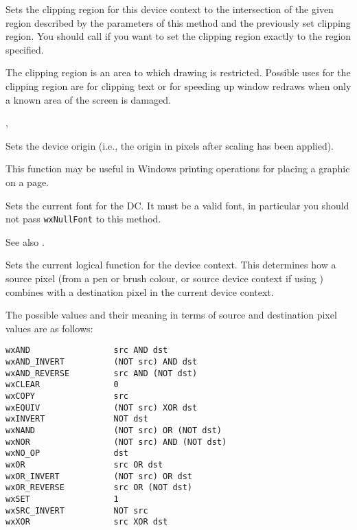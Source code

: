 
Sets the clipping region for this device context to the intersection of the
given region described by the parameters of this method and the previously set
clipping region. You should call 
 if you want to set
the clipping region exactly to the region specified.

The clipping region is an area to which drawing is restricted. Possible uses
for the clipping region are for clipping text or for speeding up window redraws
when only a known area of the screen is damaged.


, 


\label{wxdcsetdeviceorigin}


Sets the device origin (i.e., the origin in pixels after scaling has been
applied).

This function may be useful in Windows printing
operations for placing a graphic on a page.


\label{wxdcsetfont}


Sets the current font for the DC. It must be a valid font, in particular you
should not pass {\tt wxNullFont} to this method.

See also .


\label{wxdcsetlogicalfunction}


Sets the current logical function for the device context.  This determines how
a source pixel (from a pen or brush colour, or source device context if
using ) combines with a destination pixel in the
current device context.

The possible values
and their meaning in terms of source and destination pixel values are
as follows:

\begin{verbatim}
wxAND                 src AND dst
wxAND_INVERT          (NOT src) AND dst
wxAND_REVERSE         src AND (NOT dst)
wxCLEAR               0
wxCOPY                src
wxEQUIV               (NOT src) XOR dst
wxINVERT              NOT dst
wxNAND                (NOT src) OR (NOT dst)
wxNOR                 (NOT src) AND (NOT dst)
wxNO_OP               dst
wxOR                  src OR dst
wxOR_INVERT           (NOT src) OR dst
wxOR_REVERSE          src OR (NOT dst)
wxSET                 1
wxSRC_INVERT          NOT src
wxXOR                 src XOR dst
\end{verbatim}

